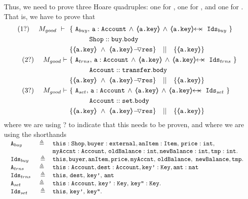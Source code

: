 \begin{proofO}
\normalsize
Thus, we need to prove  three Hoare quadruples: one for , one for  , and one for  .  That is, we have to prove that
 \small
\begin{align*}
\text{(1?)}  \ \ \ \ M_{good}\ \vdash  \  \ 
		&	\{  \ \Alocals, \, \prg{a}:\prg{Account} \, \wedge\, {\inside{\prg{a.key}}} \, \wedge \, \protectedFrom {\prg{a.key}} {\Ids}  \  \} \\
		& \SPT \prg{Shop}::\prg{buy}.\prg{body}\ \\  
		& \{ {\inside{\prg{a.key}}}\ \wedge\ {\PushASLong {\prg{res}} {\inside{\prg{a.key}}}}  \} \ \ \  || \ \ \ 
		   \{ {\inside{\prg{a.key}}} \}
\\
\text{(2?)}  \ \ \ \ M_{good} \vdash \ 
		&	\{  \ \Alocalstr, \, \prg{a}:\prg{Account}\, \wedge\,  {\inside{\prg{a.key}}} \, \wedge \, \protectedFrom {\prg{a.key}} {\Idstr}  \  \} \\
		& \SPT \prg{Account}::\prg{transfer}.\prg{body}\ \\  
		& \{ {\inside{\prg{a.key}}}\ \wedge\ {\PushASLong {\prg{res}} {\inside{\prg{a.key}}}}  \} \ \ \  || \ \ \ 
		   \{ {\inside{\prg{a.key}}} \}
\\
\text{(3?)}  \ \ \ \ M_{good} \vdash \ 
		&	\{  \ \Alocalsset, \, \prg{a}:\prg{Account}\, \wedge\,  {\inside{\prg{a.key}}} \, \wedge \, \protectedFrom {\prg{a.key}} {\Idsset}  \  \} \\
		& \SPT \prg{Account}::\prg{set}.\prg{body}\ \\  
		& \{ {\inside{\prg{a.key}}}\ \wedge\ {\PushASLong {\prg{res}} {\inside{\prg{a.key}}}}  \} \ \ \  || \ \ \ 
		   \{ {\inside{\prg{a.key}}} \}
\end{align*}
\normalsize
where we are using ? to indicate that this needs to be proven, and 
where we are using the shorthands\\
\small
$
\begin{array}{c}
\begin{array}{lcl}
 \Alocals\ &  \triangleq   \  &   \prg{this}:\prg{Shop}, \prg{buyer} : \prg{external}, \prg{anItem} : \prg{Item},\, \prg{price} : \prg{int},  \\
&  & \prg{myAccnt} : \prg{Account},\, \prg{oldBalance}:  \prg{int},  \prg{newBalance}:  \prg{int},  \prg{tmp}:  \prg{int}.\\
  \Ids\ &   \triangleq   & \prg{this},  \prg{buyer}, \prg{anItem}, \prg{price}, \prg{myAccnt},\, \prg{oldBalance},\  \prg{newBalance},  \prg{tmp}.\\ 
\Alocalstr\  & \triangleq \  &   \prg{this}:\prg{Account}, \prg{dest} : \prg{Account}, \prg{key'} : \prg{Key},\prg{amt}:\prg{nat} \\
  \Idstr\  &  \triangleq  & \prg{this},\, \prg{dest} ,\, \prg{key'},\, \prg{amt} \\
  \Alocalsset\  & \triangleq \  &   \prg{this}:\prg{Account}, \, \prg{key'} : \prg{Key},\, \prg{key''} : \prg{Key}.\\
    \Idsset\  &  \triangleq  & \prg{this},\, \prg{key'} ,\, \prg{key''}. \\
\end{array}
\end{array}
$
\normalsize


\end{proofO}
